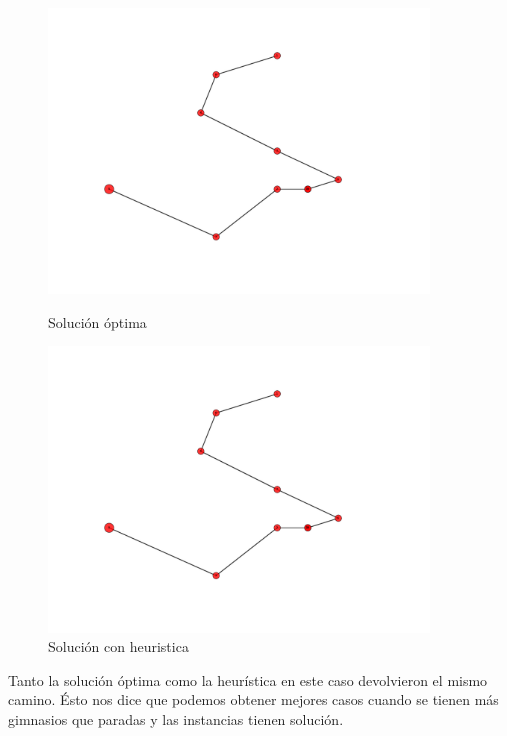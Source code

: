 \begin{figure}[H]
\centering
\begin{minipage}{0.45\textwidth}
\centering
\includegraphics[width=0.9\textwidth]{imagenes/test3-soltest3BT.pdf}
\caption{Solución óptima}
\label{fig:ej2_caso3bt}
\end{minipage}
\qquad
\begin{minipage}{0.45\textwidth}
\centering
\includegraphics[width=0.9\textwidth]{imagenes/test3-soltest3H.pdf}
\caption{Solución con heuristica}
\label{fig:ej2_caso3h}
\end{minipage}
\end{figure}

Tanto la solución óptima como la heurística en este caso devolvieron el mismo camino. Ésto nos dice que podemos obtener mejores casos cuando se tienen más gimnasios que paradas y las instancias tienen solución.


